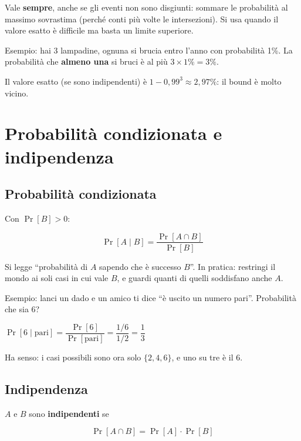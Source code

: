 Vale \textbf{sempre}, anche se gli eventi non sono disgiunti: sommare le probabilità al massimo sovrastima (perché conti più volte le intersezioni). Si usa quando il valore esatto è difficile ma basta un limite superiore.

\begin{esempio}

Esempio: hai 3 lampadine, ognuna si brucia entro l'anno con probabilità 1\%. La probabilità che \textbf{almeno una} si bruci è al più \(3 \times 1\% = 3\%\).

Il valore esatto (se sono indipendenti) è \(1 - 0{,}99^3 \approx 2{,}97\%\): il bound è molto vicino.

\end{esempio}

\section{Probabilità condizionata e indipendenza}

\subsection{Probabilità condizionata}

Con \(\Pr[B] > 0\):

\[
\Pr[A \mid B] = \frac{\Pr[A \cap B]}{\Pr[B]}
\]

Si legge ``probabilità di \(A\) sapendo che è successo \(B\)''. In pratica: restringi il mondo ai soli casi in cui vale \(B\), e guardi quanti di quelli soddisfano anche \(A\).

\begin{esempio}

Esempio: lanci un dado e un amico ti dice ``è uscito un numero pari''. Probabilità che sia 6?

\(\Pr[6 \mid \text{pari}] = \dfrac{\Pr[6]}{\Pr[\text{pari}]} = \dfrac{1/6}{1/2} = \dfrac{1}{3}\)

Ha senso: i casi possibili sono ora solo \(\{2,4,6\}\), e uno su tre è il 6.

\end{esempio}

\subsection{Indipendenza}

\(A\) e \(B\) sono \textbf{indipendenti} se

\[
\Pr[A \cap B] = \Pr[A] \cdot \Pr[B]
\]

